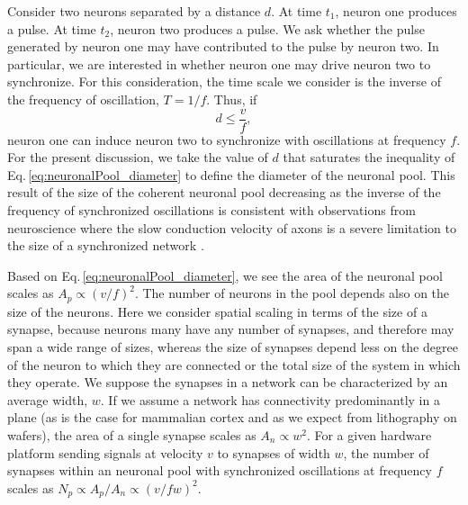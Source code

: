 \documentclass[twocolumn]{article}
\begin{document}
Consider two neurons separated by a distance $d$. At time $t_1$, neuron one produces a pulse. At time $t_2$, neuron two produces a pulse. We ask whether the pulse generated by neuron one may have contributed to the pulse by neuron two. In particular, we are interested in whether neuron one may drive neuron two to synchronize. For this consideration, the time scale we consider is the inverse of the frequency of oscillation, $T = 1/f$. Thus, if 
\begin{equation}
\label{eq:neuronalPool_diameter}
d \le \frac{v}{f},
\end{equation} 
neuron one can induce neuron two to synchronize with oscillations at frequency $f$. For the present discussion, we take the value of $d$ that saturates the inequality of Eq.\,\ref{eq:neuronalPool_diameter} to define the diameter of the neuronal pool. This result of the size of the coherent neuronal pool decreasing as the inverse of the frequency of synchronized oscillations \cite{lued1997} is consistent with observations from neuroscience \cite{stra1999} where the slow conduction velocity of axons is a severe limitation to the size of a synchronized network \cite{budr2004,bu2006,buwa2012}. 

Based on Eq.\,\ref{eq:neuronalPool_diameter}, we see the area of the neuronal pool scales as $A_p \propto (v/f)^2$. The number of neurons in the pool depends also on the size of the neurons. Here we consider spatial scaling in terms of the size of a synapse, because neurons many have any number of synapses, and therefore may span a wide range of sizes, whereas the size of synapses depend less on the degree of the neuron to which they are connected or the total size of the system in which they operate. We suppose the synapses in a network can be characterized by an average width, $w$. If we assume a network has connectivity predominantly in a plane (as is the case for mammalian cortex and as we expect from lithography on wafers), the area of a single synapse scales as $A_n \propto w^2$. For a given hardware platform sending signals at velocity $v$ to synapses of width $w$, the number of synapses within an neuronal pool with synchronized oscillations at frequency $f$ scales as $N_p \propto A_p/A_n \propto (v/fw)^2$. 
\end{document}
